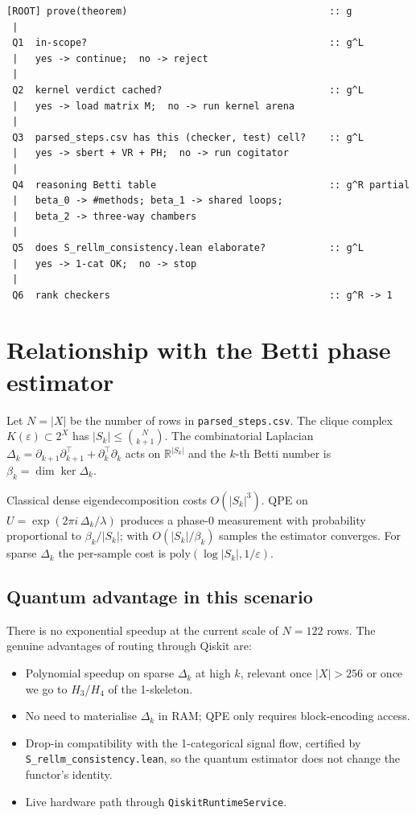 \documentclass[11pt,a4paper]{article}
\begin{document}
\begin{verbatim}
[ROOT] prove(theorem)                                   :: g
 |
 Q1  in-scope?                                          :: g^L
 |   yes -> continue;  no -> reject
 |
 Q2  kernel verdict cached?                             :: g^L
 |   yes -> load matrix M;  no -> run kernel arena
 |
 Q3  parsed_steps.csv has this (checker, test) cell?    :: g^L
 |   yes -> sbert + VR + PH;  no -> run cogitator
 |
 Q4  reasoning Betti table                              :: g^R partial
 |   beta_0 -> #methods; beta_1 -> shared loops;
 |   beta_2 -> three-way chambers
 |
 Q5  does S_rellm_consistency.lean elaborate?           :: g^L
 |   yes -> 1-cat OK;  no -> stop
 |
 Q6  rank checkers                                      :: g^R -> 1
\end{verbatim}

\section{Relationship with the Betti phase estimator}

Let $N = |X|$ be the number of rows in
\texttt{parsed\_steps.csv}. The clique complex
$K(\varepsilon) \subset 2^X$ has
$|S_k| \leq \binom{N}{k+1}$. The combinatorial Laplacian
$\Delta_k = \partial_{k+1}\partial_{k+1}^\top
+ \partial_k^\top \partial_k$
acts on $\mathbb{R}^{|S_k|}$ and the
$k$-th Betti number is
$\beta_k = \dim \ker \Delta_k$.

Classical dense eigendecomposition costs $O(|S_k|^3)$. QPE on
$U = \exp(2\pi i\, \Delta_k / \lambda)$ produces a phase-$0$
measurement with probability proportional to $\beta_k / |S_k|$; with
$O(|S_k|/\beta_k)$ samples the estimator converges. For sparse
$\Delta_k$ the per-sample cost is $\mathrm{poly}(\log |S_k|, 1/\varepsilon)$.

\subsection*{Quantum advantage in this scenario}

There is no exponential speedup at the current scale of
$N = 122$ rows. The genuine advantages of routing through Qiskit are:

\begin{itemize}
  \item Polynomial speedup on sparse $\Delta_k$ at high $k$,
        relevant once $|X| > 256$ or once we go to
        $H_3$/$H_4$ of the 1-skeleton.
  \item No need to materialise $\Delta_k$ in RAM; QPE only requires
        block-encoding access.
  \item Drop-in compatibility with the 1-categorical signal flow,
        certified by \texttt{S\_rellm\_consistency.lean}, so the
        quantum estimator does not change the functor's identity.
  \item Live hardware path through
        \texttt{QiskitRuntimeService}.
\end{itemize}
\end{document}
